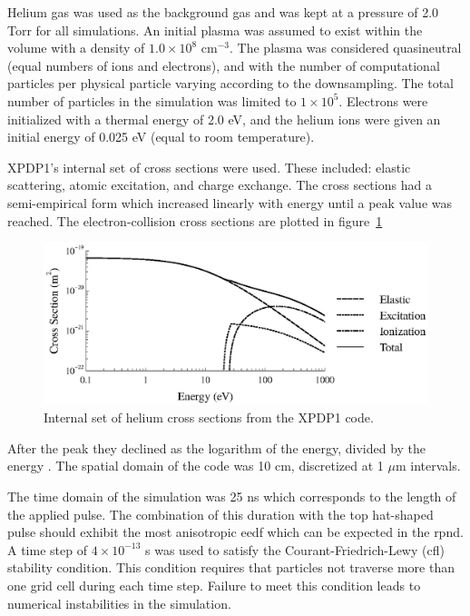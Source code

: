 Helium gas was used as the background gas and was kept at a pressure of 2.0 Torr
for all simulations. An initial plasma was assumed to exist within the volume
with a density of $1.0\times10^{8}$ cm$^{-3}$. The plasma was considered
quasineutral (equal numbers of ions and electrons), and with the number of
computational particles per physical particle varying according to the
downsampling. The total number of particles in the simulation was limited to
$1\times10^5$. Electrons were initialized with a thermal energy of 2.0 eV, and
the helium ions were given an initial energy of 0.025 eV (equal to room
temperature).

XPDP1's internal set of cross sections were used. These included:
elastic scattering, atomic excitation, and charge exchange. The cross
sections had a semi-empirical form which increased linearly with energy
until a peak value was reached. The electron-collision cross sections
are plotted in figure~\ref{fig:xsecs}
\begin{figure}
  \centering
  \includegraphics{./chapters/modeling/figures/xsecs.eps}
  \caption{Internal set of helium cross sections from the XPDP1 code.}
  \label{fig:xsecs}
\end{figure}
After the peak they declined as the logarithm of the energy, divided by
the energy \cite{Verboncoeur1993}. The spatial domain of the code was 10
cm, discretized at 1 $\mu$m intervals.

The time domain of the simulation was 25 ns which corresponds to the length of
the applied pulse. The combination of this duration with the top hat-shaped
pulse should exhibit the most anisotropic \acs{eedf} which can be expected in
the \acs{rpnd}. A time step of $4\times10^{-13}$ s was used to satisfy the
Courant-Friedrich-Lewy (\acs{cfl}) stability condition. This condition requires
that particles not traverse more than one grid cell during each time step.
Failure to meet this condition leads to numerical instabilities in the
simulation.

